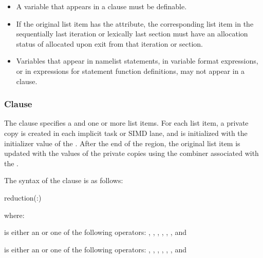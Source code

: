 {{{{\begin{itemize}
\fortranspecificstart
\item A variable that appears in a  clause must be definable.

\item If the original list item has the  attribute, the corresponding list item in the sequentially last iteration or lexically last section must have an allocation status of allocated upon exit from that iteration or section.

\item Variables that appear in namelist statements, in variable format expressions, or in 
expressions for statement function definitions, may not appear in a  
clause.
\fortranspecificend
\end{itemize}










\subsubsection{ Clause}
\label{subsubsec:reduction clause}
\summary
The  clause specifies a  and one or more list items. For 
each list item, a private copy is created in each implicit task or SIMD lane, and is 
initialized with the initializer value of the . After the end of the 
region, the original list item is updated with the values of the private copies using the 
combiner associated with the .

\syntax
\ccppspecificstart %
The syntax of the  clause is as follows:

\begin{boxedcode}
reduction(:)
\end{boxedcode}

where:

\cspecificstart %
 is either an  or one of the following operators:
\code{+},
\code{-},
\code{*}, 
\code{\&},
\code{|},
\code{\^},
\code{\&\&} and
\code{||} 
\cspecificend %

\cppspecificstart %
 is either an  or one of the following operators:
\code{+},
\code{-},
\code{*}, 
\code{\&},
\code{|},
\code{\^},
\code{\&\&} and
\code{||}
\cppspecificend %

}}}}
